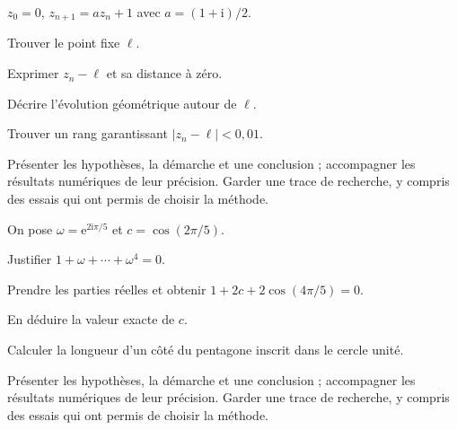 \clearpage\begingroup\renewcommand{\otThumb}{}\renewcommand{\otHeadTag}{D}\label{dossiers}\label{projet-1}
$z_0=0$, $z_{n+1}=az_n+1$ avec $a=(1+\mathrm i)/2$.
\begin{questions}
\item Trouver le point fixe $\ell$.
\item Exprimer $z_n-\ell$ et sa distance à zéro.
\item Décrire l’évolution géométrique autour de $\ell$.
\item Trouver un rang garantissant $|z_n-\ell|<0{,}01$.
\end{questions}
\vspace{5mm}\noindent Présenter les hypothèses, la démarche et une conclusion ; accompagner les résultats numériques de leur précision. Garder une trace de recherche, y compris des essais qui ont permis de choisir la méthode.\par\vfill{}\par\vspace{2mm}\noindent{}
\label{projet-2}
On pose $\omega=\mathrm e^{2\mathrm i\pi/5}$ et $c=\cos(2\pi/5)$.
\begin{questions}
\item Justifier $1+\omega+\cdots+\omega^4=0$.
\item Prendre les parties réelles et obtenir $1+2c+2\cos(4\pi/5)=0$.
\item En déduire la valeur exacte de $c$.
\item Calculer la longueur d’un côté du pentagone inscrit dans le cercle unité.
\end{questions}
\vspace{5mm}\noindent Présenter les hypothèses, la démarche et une conclusion ; accompagner les résultats numériques de leur précision. Garder une trace de recherche, y compris des essais qui ont permis de choisir la méthode.\par\vfill{}\par\vspace{2mm}\noindent{}
